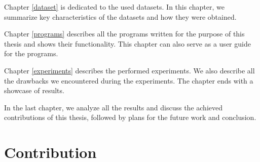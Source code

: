 Chapter \ref{dataset} is dedicated to the used datasets. In this chapter, we summarize key characteristics of the datasets and how they were obtained.

Chapter \ref{programs} describes all the programs written for the purpose of this thesis and shows their functionality. This chapter can also serve as a user guide for the programs.

Chapter \ref{experiments} describes the performed experiments. We also describe all the drawbacks we encountered during the experiments. The chapter ends with a showcase of results.

In the last chapter, we analyze all the results and discuss the achieved contributions of this thesis, followed by plans for the future work and conclusion.

\section{Contribution}

